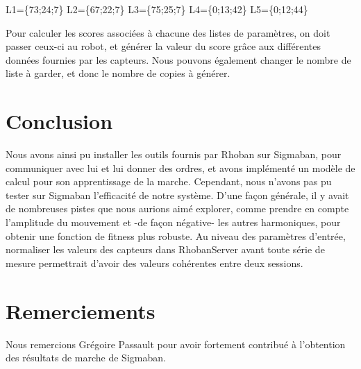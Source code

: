 \documentclass[11pt]{article}
\begin{document}
L1=\{73;24;7\}
L2=\{67;22;7\}
L3=\{75;25;7\}
L4=\{0;13;42\}
L5=\{0;12;44\}

Pour calculer les scores associées à chacune des listes de paramètres, on doit passer ceux-ci au robot, et générer la valeur du score grâce aux différentes données fournies par les capteurs. Nous pouvons également changer le nombre de liste à garder, et donc le nombre de copies à générer.

\section{Conclusion}
Nous avons ainsi pu installer les outils fournis par Rhoban sur Sigmaban, pour communiquer avec lui et lui donner des ordres, et avons implémenté un modèle de calcul pour son apprentissage de la marche. Cependant, nous n'avons pas pu tester sur Sigmaban l'efficacité de notre système. D'une façon générale, il y avait de nombreuses pistes que nous aurions aimé explorer, comme prendre en compte l'amplitude du mouvement et -de façon négative- les autres harmoniques, pour obtenir une fonction de fitness plus robuste. Au niveau des paramètres d'entrée, normaliser les valeurs des capteurs dans RhobanServer avant toute série de mesure permettrait d'avoir des valeurs cohérentes entre deux sessions. 
\section{Remerciements}
Nous remercions Grégoire Passault pour avoir fortement contribué à l'obtention des résultats de marche de Sigmaban.
\end{document}
